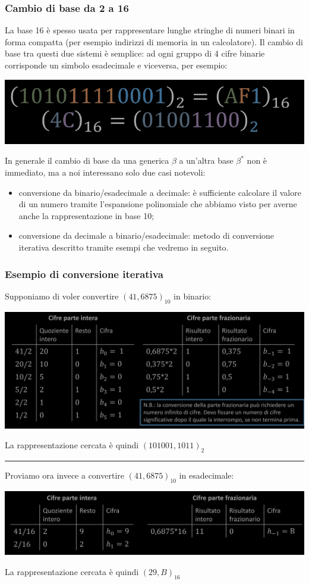 \documentclass{article}
\begin{document}
\subsubsection{Cambio di base da 2 a 16}
La base 16 è spesso usata per rappresentare lunghe stringhe di numeri binari in forma compatta (per esempio indirizzi di memoria in un calcolatore). Il cambio di base tra questi due sistemi è semplice: ad ogni gruppo di 4 cifre binarie corrisponde un simbolo esadecimale e viceversa, per esempio:
\begin{center}
    \includegraphics[scale=0.35]{esEs.png}
\end{center}
In generale il cambio di base da una generica $\beta$ a un'altra base $\beta^*$ non è immediato, ma a noi interessano solo due casi notevoli:
\begin{itemize}
    \item conversione da binario/esadecimale a decimale: è sufficiente calcolare il valore di un numero tramite l’espansione polinomiale che abbiamo visto per averne anche la rappresentazione in base 10;
    \item conversione da decimale a binario/esadecimale: metodo di conversione iterativa descritto tramite esempi che vedremo in seguito.
\end{itemize}
\subsubsection{Esempio di conversione iterativa}
Supponiamo di voler convertire $(41,6875)_{10}$ in binario:
\begin{center}
    \includegraphics[scale=0.4]{esIter.png}
\end{center}
La rappresentazione cercata è quindi $(101001,1011)_2$
\par\noindent\rule{\textwidth}{0.4pt}
Proviamo ora invece a convertire $(41,6875)_{10}$ in esadecimale:
\begin{center}
    \includegraphics[scale=0.35]{esIterEs.png}
\end{center}
La rappresentazione cercata è quindi $(29,B)_{16}$
\end{document}
